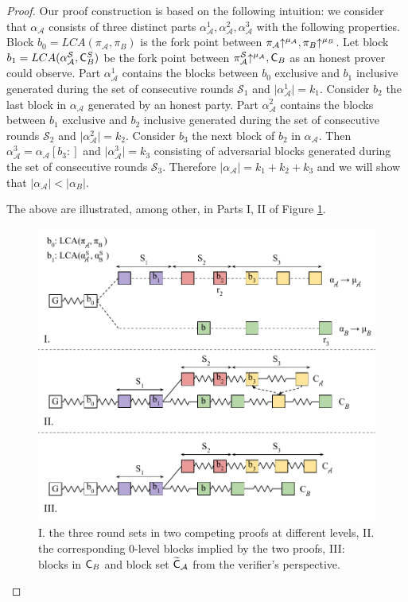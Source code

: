 \begin{proof}
Our proof construction is based on the following intuition: we consider that $\alpha_\mathcal{A}$ consists of three distinct parts $\alpha_\mathcal{A}^1, \alpha_\mathcal{A}^2, \alpha_\mathcal{A}^3$ with the following properties.
Block $b_0 = LCA(\pi_\mathcal{A}, \pi_B)$ is the fork point between $\pi_\mathcal{A} \negthickspace\uparrow^{\mu_\mathcal{A}}, \pi_B \negthickspace\uparrow^{\mu_B}$. Let block $b_1 = LCA (\alpha^{\mathcal{S}}_\mathcal{A}, \mathsf{C}^S_B)$ be the fork point between $\pi^{\mathcal{S}}_\mathcal{A} \negthickspace\uparrow^{\mu_\mathcal{A}}, \mathsf{C}_B $ as an honest prover could observe. Part $\alpha_\mathcal{A}^1$ contains the blocks between $b_0$ exclusive and $b_1$ inclusive generated during the set of consecutive rounds $\mathcal{S}_1$ and $\lvert  \alpha_\mathcal{A}^1 \rvert = k_1$. Consider $b_2$ the last block in $\alpha_\mathcal{A}$ generated by an honest party. Part $\alpha_{\mathcal{A}}^2$ contains the blocks between $b_1$ exclusive and $b_2$ inclusive generated during the set of consecutive rounds $\mathcal{S}_2$ and $\vert  \alpha_\mathcal{A}^2 \vert = k_2$. Consider $b_3$ the next block of $b_2$ in $\alpha_\mathcal{A}$. Then $\alpha_{\mathcal{A}}^3 = \alpha_\mathcal{A}[b_3{:}]$ and $\vert  \alpha_\mathcal{A}^3 \vert = k_3$ consisting of adversarial blocks generated during the set of consecutive rounds $\mathcal{S}_3$. Therefore $\vert \alpha_\mathcal{A} \vert = k_1 + k_2 + k_3$ and we will show that $\vert \alpha_\mathcal{A} \vert < \vert \alpha_B \vert$.

The above are illustrated, among other, in Parts I, II of Figure \ref{fig:proof_velvet}.

\begin{figure}
    \begin{center}
        \includegraphics[width=0.95 \columnwidth]{figures/proof_velvet-crop.pdf}
    \end{center}
    \caption{I. the three round sets in two competing proofs at different levels, II. the corresponding 0-level blocks implied by the two proofs, III: blocks in $\mathsf{C}_B$ and block set $\widetilde{\mathsf{C}}_\mathcal{A}$ from the verifier's perspective.}
    \label{fig:proof_velvet}
\end{figure}


\end{proof}
